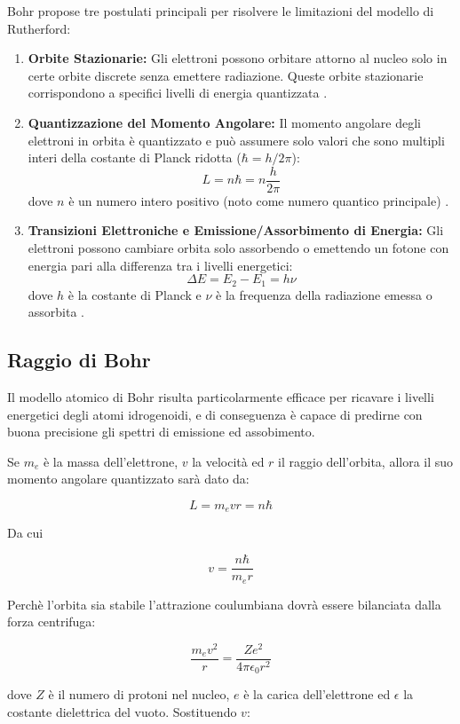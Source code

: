 \documentclass[12pt,a4paper]{report}
\begin{document}
Bohr propose tre postulati principali per risolvere le limitazioni del modello di Rutherford:

\begin{enumerate}
    \item \textbf{Orbite Stazionarie:} Gli elettroni possono orbitare attorno al nucleo solo in certe orbite discrete senza emettere radiazione. Queste orbite stazionarie corrispondono a specifici livelli di energia quantizzata \cite{BohrModelBritannica}.
    \item \textbf{Quantizzazione del Momento Angolare:} Il momento angolare degli elettroni in orbita è quantizzato e può assumere solo valori che sono multipli interi della costante di Planck ridotta (\(\hbar = h/2\pi\)):
        \[L = n\hbar = n\frac{h}{2\pi}\]
        dove \( n \) è un numero intero positivo (noto come numero quantico principale) \cite{HyperPhysicsBohr}.
 
    \item \textbf{Transizioni Elettroniche e Emissione/Assorbimento di Energia:} Gli elettroni possono cambiare orbita solo assorbendo o emettendo un fotone con energia pari alla differenza tra i livelli energetici:
        \[\Delta E = E_2 - E_1 = h\nu\]
        dove \( h \) è la costante di Planck e \( \nu \) è la frequenza della radiazione emessa o assorbita \cite{Bohr1913}.
 \end{enumerate}

\subsection{Raggio di Bohr}

Il modello atomico di Bohr risulta particolarmente efficace per ricavare i livelli energetici degli atomi idrogenoidi, e di conseguenza è capace di predirne con buona precisione gli spettri di emissione ed assobimento.

Se \(m_e\) è la massa dell'elettrone, \(v\) la velocità ed \(r\) il raggio dell'orbita, allora il suo momento angolare quantizzato sarà dato da:

\[ L = m_e v r = n \hbar \]

Da cui

\[ v = \frac{n \hbar}{m_e r} \]

Perchè l'orbita sia stabile l'attrazione coulumbiana dovrà essere bilanciata dalla forza centrifuga:

\[ \frac{m_e v^2}{r} = \frac{Ze^2}{4 \pi \epsilon_0 r^2} \]

dove \(Z\) è il numero di protoni nel nucleo, \(e\) è la carica dell'elettrone ed \(\epsilon\) la costante dielettrica del vuoto. Sostituendo \(v\):
\end{document}
